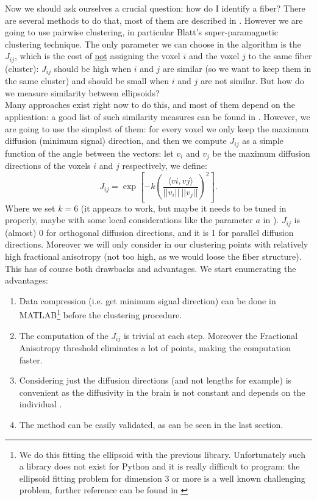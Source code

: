 \documentclass{article} %
\begin{document}
Now we should ask ourselves a crucial question: how do I identify a fiber? There are several methods to do that, most of them are described in \cite{Mukherjee01042008}.
However we are going to use pairwise clustering, in particular Blatt's super-paramagnetic clustering technique\cite{Blatt1997}. The only parameter we can choose in the algorithm is the $J_{ij}$, which is the cost of \underline{not} assigning the voxel $i$ and the voxel $j$ to the same fiber (cluster): $J_{ij}$ should be high when $i$ and $j$ are similar (so we want to keep them in the same cluster) and should be small when $i$ and $j$ are not similar. But how do we measure similarity between ellipsoids? \\
Many approaches exist right now to do this, and most of them depend on the application: a good list of such similarity measures can be found in \cite{Peeters2009}. However, we are going to use the simplest of them: for every voxel we only keep the maximum diffusion (minimum signal) direction, and then we compute $J_{ij}$ as a simple function of the angle between the vectors: let $v_i$ and $v_j$ be the maximum diffusion directions of the voxels $i$ and $j$ respectively, we define:
\begin{equation}
J_{ij}= \exp\left[-k \left(\frac{\langle vi, vj \rangle}{||v_i|| \ ||v_j||}\right)^2\right].
\end{equation}
Where we set $k=6$ (it appears to work, but maybe it needs to be tuned in properly, maybe with some local considerations like the parameter $a$ in \cite{Blatt1997}). $J_{ij}$ is (almost) 0 for orthogonal diffusion directions, and it is 1 for parallel diffusion directions. Moreover we will only consider in our clustering points with relatively high fractional anisotropy (not too high, as we would loose the fiber structure). This has of course both drawbacks and advantages. We start enumerating the advantages:

\begin{enumerate}
\item Data compression (i.e. get minimum signal direction) can be done in MATLAB\footnote{We do this fitting the ellipsoid with the previous library. Unfortunately such a library does not exist for Python and it is really difficult to program: the ellipsoid fitting problem for dimension 3 or more is a well known challenging problem, further reference can be found in \cite{Ellips}} before the clustering procedure.
\item The computation of the $J_{ij}$ is trivial at each step.  Moreover the Fractional Anisotropy threshold eliminates a lot of points, making the computation faster.
\item Considering just the diffusion directions (and not lengths for example) is convenient as the diffusivity in the brain is not constant and depends on the individual \cite{Alex}.
\item The method can be easily validated, as can be seen in the last section.
\end{enumerate}
\end{document}

